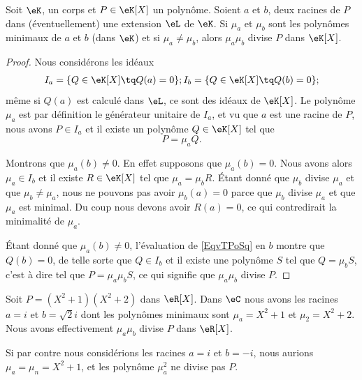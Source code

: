 \begin{proposition} \label{PropyMTEbH}
    Soit \( \eK\), un corps et \( P\in \eK[X]\) un polynôme. Soient \( a\) et \( b\), deux racines de \( P\) dans (éventuellement) une extension \( \eL\) de \( \eK\). Si \( \mu_a\) et \( \mu_b\) sont les polynômes minimaux de \( a\) et \( b\) (dans \( \eK\)) et si \( \mu_a\neq \mu_b\), alors \( \mu_a\mu_b\) divise \( P\) dans \( \eK[X]\).
\end{proposition}

\begin{proof}
    Nous considérons les idéaux
    \begin{subequations}
        \begin{align}
            I_a=\{ Q\in \eK[X]\tq Q(a)=0 \};
            I_b=\{ Q\in \eK[X]\tq Q(b)=0 \};
        \end{align}
    \end{subequations}
    même si \( Q(a)\) est calculé dans \( \eL\), ce sont des idéaux de \( \eK[X]\). Le polynôme \( \mu_a\) est par définition le générateur unitaire de \( I_a\), et vu que \( a\) est une racine de \( P\), nous avons \( P\in I_a\) et il existe un polynôme \( Q\in \eK[X]\) tel que 
    \begin{equation}    \label{EqvTPoSq}
        P=\mu_aQ.
    \end{equation}

    Montrons que \( \mu_a(b)\neq 0\). En effet supposons que \( \mu_a(b)=0\). Nous avons alors \( \mu_a\in I_b\) et il existe \( R\in \eK[X]\) tel que \( \mu_a=\mu_bR\). Étant donné que \( \mu_b\) divise \( \mu_a\) et que \( \mu_b\neq \mu_a\), nous ne pouvons pas avoir \( \mu_b(a)=0\) parce que \( \mu_b\) divise \( \mu_a\) et que \( \mu_a\) est minimal. Du coup nous devons avoir \( R(a)=0\), ce qui contredirait la minimalité de \( \mu_a\).

    Étant donné que \( \mu_a(b)\neq 0\), l'évaluation de \eqref{EqvTPoSq} en \( b\) montre que \( Q(b)=0\), de telle sorte que \( Q\in I_b\) et il existe une polynôme \( S\) tel que \( Q=\mu_bS\), c'est à dire tel que \( P=\mu_a\mu_bS\), ce qui signifie que \( \mu_a\mu_b\) divise \( P\).
\end{proof}


\begin{example}
    Soit \( P=(X^2+1)(X^2+2)\) dans \( \eR[X]\). Dans \( \eC\) nous avons les racines \( a=i\) et \( b=\sqrt{2}i\) dont les polynômes minimaux sont \( \mu_a=X^2+1\) et \( \mu_2=X^2+2\). Nous avons effectivement \( \mu_a\mu_b\) divise \( P\) dans \( \eR[X]\).

    Si par contre nous considérions les racines \( a=i\) et \( b=-i\), nous aurions \( \mu_a=\mu_n=X^2+1\), et les polynôme \( \mu_a^2\) ne divise pas \( P\).
\end{example}

